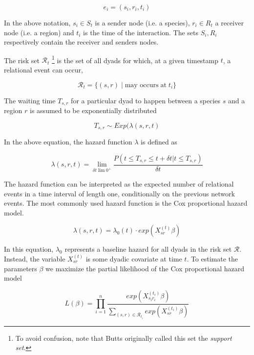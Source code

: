 \documentclass[mscthesis]{usiinfthesis}
\begin{document}
\[
e_i = (s_i, r_i, t_i)
\]

\noindent In the above notation, $s_i \in S_{t} $ is a sender node (i.e. a species), $r_i \in R_{t}$ a receiver node (i.e. a region) and $t_i$ is the time of the interaction. The sets $S_i, R_i$ respectively contain the receiver and senders nodes.

%

The risk set $\mathcal{R}_t$ \footnote{To avoid confusion, note that Butts originally called this set the \textit{support set}.} is the set of all dyads for which, at a given timestamp $t$, a relational event can occur,

\[
\mathcal{R}_{t} = \{(s,r) \; | \; \textrm{may occurs} \; \textrm{at} \; t_i\}
\]

\noindent The waiting time $T_{s,r}$ for a particular dyad to happen between a species $s$ and a region $r$ is assumed to be exponentially distributed 

\[
T_{s,r} \sim Exp(\lambda(s, r, t)
\]


In the above equation, the hazard function $\lambda$ is defined as

\[
\lambda(s, r, t) = \lim_{\delta t \lim 0^+} \frac{P(t \leq T_{s,r} \leq t + \delta t | t \leq T_{s,r})}{\delta t}
\]

\noindent The hazard function can be interpreted as the expected number of relational events in a time interval of length one, conditionally on the previous network events. The most commonly used hazard function is the Cox proportional hazard model. 


\[
\lambda(s, r, t) = \lambda_0(t) \cdot exp({X_{sr}^{(t)} \beta} )
\]

\noindent In this equation, $\lambda_0$ represents a baseline hazard for all dyads in the risk set $\mathcal{R}$. Instead, the variable $X_{sr}^{(t)}$ is some dyadic covariate at time $t$. To estimate the parameters $\beta$ we maximize the partial likelihood of the Cox proportional hazard model 

\[
L(\beta) =  \prod_{i=1}^n \frac{exp (X_{s_i r_i}^{(t_i)} \beta) }{ \sum_{(s,r) \in \mathcal{R}_{t_i}} exp({X_{sr}^{(t_i)} \beta} )}
\]
\end{document}
